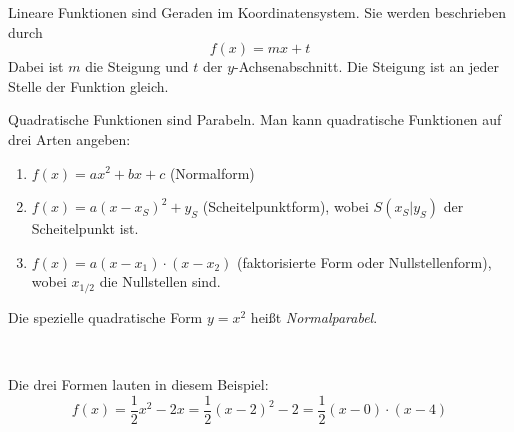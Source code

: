 \documentclass[ngerman, 12pt]{nssheetxea}
\begin{document}
\begin{definition}
 
Lineare Funktionen sind Geraden im Koordinatensystem. Sie werden beschrieben durch
\[ f(x)=mx+t\]
Dabei ist $m$ die Steigung und $t$ der $y$-Achsenabschnitt. Die Steigung ist an jeder Stelle der Funktion gleich.

\begin{center}
\end{center}
\end{definition}

\begin{definition}
 
Quadratische Funktionen sind Parabeln. Man kann quadratische Funktionen auf drei Arten angeben:
\begin{enumerate}
\item $f(x)=ax^2+bx+c$ (Normalform) 
\item $f(x)=a(x-x_S)^2+y_S$ (Scheitelpunktform), wobei $S(x_S|y_S)$ der Scheitelpunkt ist. 
\item $f(x)=a(x-x_1)\cdot (x-x_2)$ (faktorisierte Form oder Nullstellenform), wobei $x_{1/2}$ die Nullstellen sind. 
\end{enumerate}
Die spezielle quadratische Form $y=x^2$ heißt \textit{Normalparabel}. 
\end{definition}


\begin{example} \ \par
\begin{center}
\end{center}
Die drei Formen lauten in diesem Beispiel:
\[ f(x)= \frac{1}{2}x^2 -2x = \frac{1}{2}(x-2)^2-2 = \frac{1}{2} (x-0) \cdot (x-4) \]
\end{example}
\end{document}
